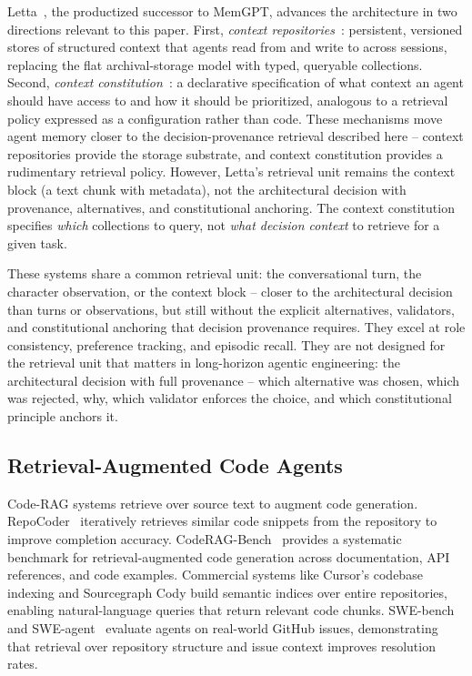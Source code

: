 \documentclass[11pt]{article}
\begin{document}
Letta~\citep{letta2025lettacode}, the productized successor to MemGPT, advances the architecture in two directions relevant to this paper.
First, \emph{context repositories}~\citep{letta2026repositories}: persistent, versioned stores of structured context that agents read from and write to across sessions, replacing the flat archival-storage model with typed, queryable collections.
Second, \emph{context constitution}~\citep{letta2026constitution}: a declarative specification of what context an agent should have access to and how it should be prioritized, analogous to a retrieval policy expressed as a configuration rather than code.
These mechanisms move agent memory closer to the decision-provenance retrieval described here -- context repositories provide the storage substrate, and context constitution provides a rudimentary retrieval policy.
However, Letta's retrieval unit remains the context block (a text chunk with metadata), not the architectural decision with provenance, alternatives, and constitutional anchoring.
The context constitution specifies \emph{which} collections to query, not \emph{what decision context} to retrieve for a given task.

These systems share a common retrieval unit: the conversational turn, the character observation, or the context block -- closer to the architectural decision than turns or observations, but still without the explicit alternatives, validators, and constitutional anchoring that decision provenance requires.
They excel at role consistency, preference tracking, and episodic recall.
They are not designed for the retrieval unit that matters in long-horizon agentic engineering: the architectural decision with full provenance -- which alternative was chosen, which was rejected, why, which validator enforces the choice, and which constitutional principle anchors it.

\subsection{Retrieval-Augmented Code Agents}
\label{sec:related-code-rag}

Code-RAG systems retrieve over source text to augment code generation.
RepoCoder~\citep{zhang2023repocoder} iteratively retrieves similar code snippets from the repository to improve completion accuracy.
CodeRAG-Bench~\citep{wang2024coderagbench} provides a systematic benchmark for retrieval-augmented code generation across documentation, API references, and code examples.
Commercial systems like Cursor's codebase indexing and Sourcegraph Cody build semantic indices over entire repositories, enabling natural-language queries that return relevant code chunks.
SWE-bench~\citep{jimenez2024swebench} and SWE-agent~\citep{yang2024sweagent} evaluate agents on real-world GitHub issues, demonstrating that retrieval over repository structure and issue context improves resolution rates.
\end{document}
